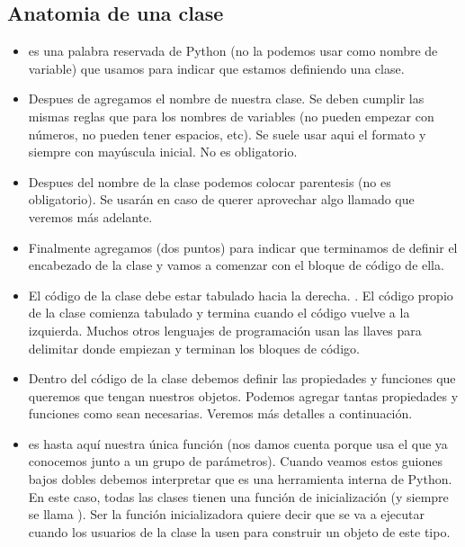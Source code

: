 \documentclass[a4paper,12pt,spanish]{sphinxmanual}
\begin{document}
\subsection{Anatomia de una clase}
\label{\detokenize{class:anatomia-de-una-clase}}\begin{itemize}
\item {} 
\sphinxAtStartPar
{} es una palabra reservada de Python (no la podemos usar como nombre de variable)
que usamos para indicar que estamos definiendo una clase.

\item {} 
\sphinxAtStartPar
Despues de  agregamos el nombre de nuestra clase. Se deben cumplir las mismas
reglas que para los nombres de variables (no pueden empezar con números, no pueden tener
espacios, etc). Se suele usar aqui el formato  y siempre con mayúscula inicial.
No es obligatorio.

\item {} 
\sphinxAtStartPar
Despues del nombre de la clase podemos colocar parentesis (no es obligatorio). Se usarán
en caso de querer aprovechar algo llamado  que veremos más adelante.

\item {} 
\sphinxAtStartPar
Finalmente agregamos \sphinxstyleemphasis{:} (dos puntos) para indicar que terminamos de definir el encabezado
de la clase y vamos a comenzar con el bloque de código de ella.

\item {} 
\sphinxAtStartPar
El código de la clase debe estar tabulado hacia la derecha. . El código propio de
la clase comienza tabulado y termina cuando el código vuelve a la izquierda. Muchos otros
lenguajes de programación usan las llaves \sphinxcode{\sphinxupquote{\{\}}} para delimitar donde empiezan y terminan
los bloques de código.

\item {} 
\sphinxAtStartPar
Dentro del código de la clase debemos definir las propiedades y funciones que queremos que
tengan nuestros objetos. Podemos agregar tantas propiedades y funciones como sean necesarias.
Veremos más detalles a continuación.

\item {} 
\sphinxAtStartPar
{} es hasta aquí nuestra única función (nos damos cuenta porque usa el  que
ya conocemos junto a un grupo de parámetros). Cuando veamos estos guiones bajos dobles
debemos interpretar que es una herramienta interna de Python. En este caso, todas las clases
tienen una función de inicialización (y siempre se llama ).
Ser la función inicializadora quiere decir que se va a ejecutar cuando
los usuarios de la clase la usen para construir un objeto de este tipo.


\end{itemize}
\end{document}
